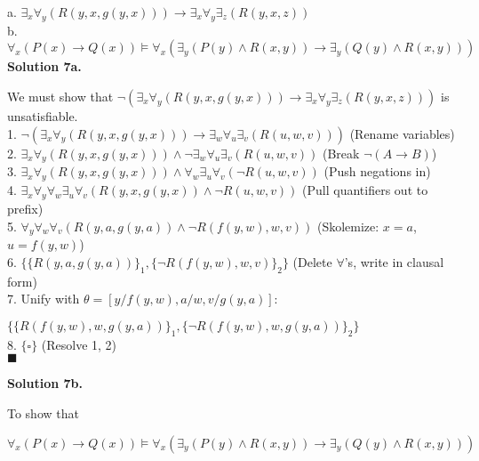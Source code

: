 \documentclass{article}
\newcommand{\tOne}{7.5cm}
\begin{document}
{a. $\exists_x\forall_y(R(y, x, g(y, x))) \rightarrow \exists_x\forall_y\exists_z(R(y, x, z))$\\

b. $\forall_x(P(x) \rightarrow Q(x)) \vDash \forall_x(\exists_y(P(y) \wedge R(x, y)) \rightarrow \exists_y(Q(y) \wedge R(x, y)))$\\

\textbf{\large{Solution 7a.}}

We must show that $\neg(\exists_x\forall_y(R(y, x, g(y, x))) \rightarrow \exists_x\forall_y\exists_z(R(y, x, z)))$ is unsatisfiable.\\

1. $\neg(\exists_x\forall_y(R(y, x, g(y, x))) \rightarrow \exists_w\forall_u\exists_v(R(u, w, v)))$ \tabto{\tOne}(Rename variables)\\

2. $\exists_x\forall_y(R(y, x, g(y, x))) \wedge \neg\exists_w\forall_u\exists_v(R(u, w, v))$ \tabto{\tOne}(Break $\neg(A \rightarrow B)$)\\

3. $\exists_x\forall_y(R(y, x, g(y, x))) \wedge \forall_w\exists_u\forall_v(\neg{R}(u, w, v))$ \tabto{\tOne}(Push negations in)\\

4. $\exists_x\forall_y\forall_w\exists_u\forall_v(R(y, x, g(y, x)) \wedge \neg{R}(u, w, v))$ \tabto{\tOne}(Pull quantifiers out to prefix)\\

5. $\forall_y\forall_w\forall_v(R(y, a, g(y, a)) \wedge \neg{R}(f(y, w), w, v))$ \tabto{\tOne}(Skolemize: $x = a$, $u = f(y, w)$)\\

6. $\{\{R(y, a, g(y, a))\}_1, \{\neg{R}(f(y, w), w, v)\}_2\}$ \tabto{\tOne}(Delete $\forall$'s, write in clausal form)\\

7. Unify with $\theta = [y/f(y, w), a/w, v/g(y, a)]$:

$\{\{R(f(y, w), w, g(y, a))\}_1, \{\neg{R}(f(y, w), w, g(y, a))\}_2\}$\\

8. $\{\square\}$ \tabto{\tOne}(Resolve 1, 2)\\

$\blacksquare$

\pagebreak

\textbf{\large{Solution 7b.}}

To show that 

\begin{center}
$\forall_x(P(x) \rightarrow Q(x)) \vDash \forall_x(\exists_y(P(y) \wedge R(x, y)) \rightarrow \exists_y(Q(y) \wedge R(x, y)))$
\end{center}

}
\end{document}
